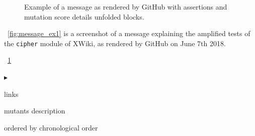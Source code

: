 \documentclass[a4paper,11pt]{sdm_internship}
\theoremstyle{definition}
\begin{document}
\begin{appendices}
\begin{figure}[H]
  \centering
  \caption{Example of a message as rendered by GitHub with assertions and mutation score details unfolded blocks.}%
  \label{fig:message_ex1_unfolded}
\end{figure}

\figurename~\ref{fig:message_ex1} is a screenshot of a message explaining the amplified tests of the \texttt{cipher} module of XWiki, as rendered by GitHub on June 7th 2018.

\figurename~\ref{fig:message_ex1_unfolded}

$\blacktriangleright$

links

mutants description

ordered by chronological order

\end{appendices}
\end{document}
